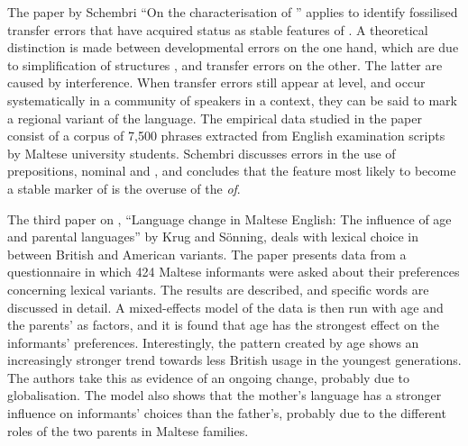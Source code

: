 \documentclass[output=paper]{LSP/langsci}
\begin{document}
The paper by Schembri ``On the characterisation of ''
applies  to identify fossilised transfer errors that
have acquired status as stable features of . A
theoretical distinction is made between developmental errors on the
one hand, which are due to simplification of 
structures%
, and transfer errors on the other. The latter are caused
by  interference. When transfer errors still appear at
 level, and occur systematically in a community of
speakers in a  context, they can be said to mark a regional
variant of the language. The empirical data studied in the paper
consist of a corpus of 7,500  phrases extracted from English
examination scripts by Maltese university students. Schembri discusses
errors in the use of prepositions, nominal  and ,
and concludes that the feature most likely to become a stable marker of 
 is the overuse of the  {\em of}.

The third paper on , ``Language change in Maltese
English: The influence of age and parental languages'' by Krug and
S{\"o}nning, deals with lexical choice in  between
British and American variants. The paper
presents data from a questionnaire in which 424 Maltese
informants were asked about their preferences concerning 
lexical variants. The results are described, and specific words
are discussed in detail. A mixed-effects model of the data is
then run with age and the parents'  as factors,
and it is found that age has the strongest effect on the informants' preferences. 
Interestingly, the pattern created by age shows an
increasingly stronger trend towards less British usage in the youngest
generations. The authors take this as evidence of an ongoing change,
probably due to globalisation. The model also shows that the mother's
language has a stronger influence on informants' choices than the
father's, probably due to the different roles of the two parents in
Maltese families.
\end{document}
